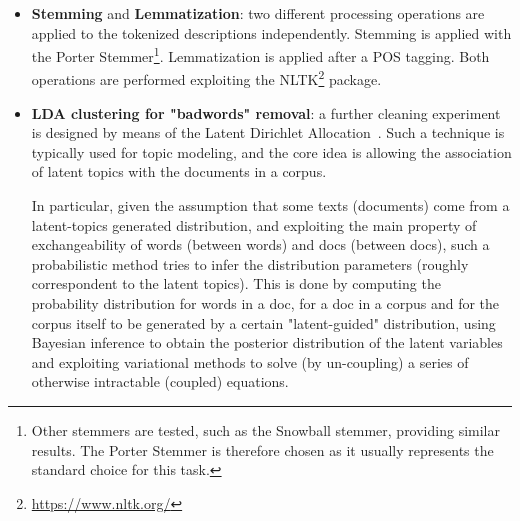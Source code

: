 \documentclass[10pt]{article}
\begin{document}
\begin{itemize}
\item \textbf{Stemming} and \textbf{Lemmatization}: two different processing operations are applied to the tokenized descriptions independently. Stemming is applied with the Porter Stemmer\footnote{Other stemmers are tested, such as the Snowball stemmer, providing similar results. The Porter Stemmer is therefore chosen as it usually represents the standard choice for this task.}.
Lemmatization is applied after a POS tagging. Both operations are performed exploiting the NLTK\footnote{\url{https://www.nltk.org/}} package.

\item \textbf{LDA clustering for "badwords" removal}: a further cleaning experiment is designed by means of the Latent Dirichlet Allocation~\cite{lda}. Such a technique is typically used for topic modeling, and the core idea is allowing the association of latent topics with the documents in a corpus.

In particular, given the assumption that some texts (documents) come from a latent-topics generated distribution, and exploiting the main property of exchangeability of words (between words) and docs (between docs), such a probabilistic method tries to infer the distribution parameters (roughly correspondent to the latent topics).
This is done by computing the probability distribution for words in a doc, for a doc in a corpus and for the corpus itself to be generated by a certain "latent-guided" distribution, using Bayesian inference to obtain the posterior distribution of the latent variables and exploiting variational methods to solve (by un-coupling) a series of otherwise intractable (coupled) equations.


\end{itemize}
\end{document}
